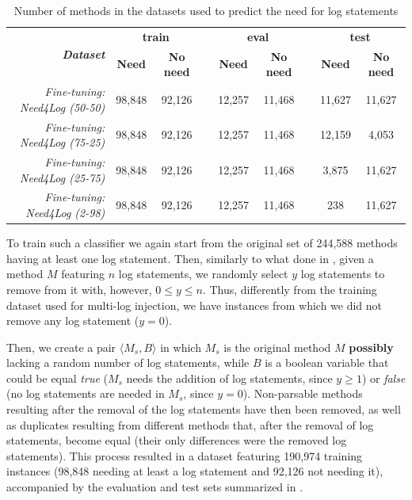 \begin{table}[h!]
	\centering
	\scriptsize
	\caption{Number of methods in the datasets used to predict the need for log statements\vspace{-0.3cm}}
	\begin{tabular}{rcccccccc}
		\toprule
		\multirow{2}{*}{\textit{\textbf{Dataset}}} & \multicolumn{2}{c}{\textbf{train}} & \textbf{} & \multicolumn{2}{c}{\textbf{eval}}  & \textbf{} & \multicolumn{2}{c}{\textbf{test}}  \\ \cline{2-3} \cline{5-6} \cline{8-9} 
		& \textbf{Need} & \textbf{No need}   & \textbf{} & \textbf{Need} & \textbf{No need}   & \textbf{} & \textbf{Need} & \textbf{No need}   \\ \midrule
		\textit{Fine-tuning: Need4Log (50-50)}         & 98,848        & 92,126             &           & 12,257        & 11,468             &           & 11,627        &  11,627            \\
		\textit{Fine-tuning: Need4Log (75-25)}         & 98,848        & 92,126             &           & 12,257        & 11,468             &           & 12,159        &  4,053             \\
		\textit{Fine-tuning: Need4Log (25-75)}         & 98,848        & 92,126             &           & 12,257        & 11,468             &           & 3,875         &  11,627            \\ 
		\textit{Fine-tuning: Need4Log (2-98)}         & 98,848        & 92,126             &           & 12,257        & 11,468             &           & 238         &  11,627            \\ 
		\bottomrule
	\end{tabular}
	\label{tab:ds-summary-2}
\end{table}

To train such a classifier we again start from the original set of 244,588 \java methods having at least one log statement. Then, similarly to what done in , given a method $M$ featuring $n$ log statements, we randomly select $y$ log statements to remove from it with, however, $0 \leq y \leq n$. Thus, differently from the training dataset used for multi-log injection, we have instances from which we did not remove any log statement ($y=0$). 

Then, we create a pair $\langle M_s, B \rangle$ in which $M_s$ is the original method $M$ \textbf{possibly} lacking a random number of log statements, while $B$ is a boolean variable that could be equal \emph{true} (\ie $M_s$ needs the addition of log statements, since $y \geq 1$) or \emph{false} (\ie no log statements are needed in $M_s$, since $y = 0$). Non-parsable methods resulting after the removal of the log statements have then been removed, as well as duplicates resulting from different methods that, after the removal of log statements, become equal (\ie their only differences were the removed log statements). This process resulted in a dataset featuring 190,974 training instances (98,848 needing at least a log statement and 92,126 not needing it), accompanied by the evaluation and test sets summarized in .

